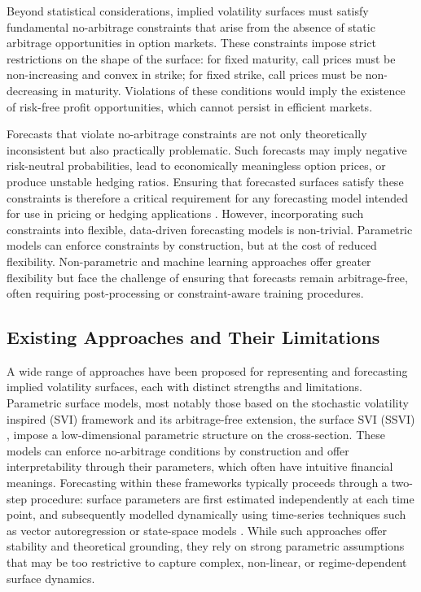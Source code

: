 Beyond statistical considerations, implied volatility surfaces must satisfy fundamental no-arbitrage constraints that arise from the absence of static arbitrage opportunities in option markets. These constraints impose strict restrictions on the shape of the surface: for fixed maturity, call prices must be non-increasing and convex in strike; for fixed strike, call prices must be non-decreasing in maturity. Violations of these conditions would imply the existence of risk-free profit opportunities, which cannot persist in efficient markets.

Forecasts that violate no-arbitrage constraints are not only theoretically inconsistent but also practically problematic. Such forecasts may imply negative risk-neutral probabilities, lead to economically meaningless option prices, or produce unstable hedging ratios. Ensuring that forecasted surfaces satisfy these constraints is therefore a critical requirement for any forecasting model intended for use in pricing or hedging applications \cite{Gat:06,Fen:05}. However, incorporating such constraints into flexible, data-driven forecasting models is non-trivial. Parametric models can enforce constraints by construction, but at the cost of reduced flexibility. Non-parametric and machine learning approaches offer greater flexibility but face the challenge of ensuring that forecasts remain arbitrage-free, often requiring post-processing or constraint-aware training procedures.

\subsection{Existing Approaches and Their Limitations}

A wide range of approaches have been proposed for representing and forecasting implied volatility surfaces, each with distinct strengths and limitations. Parametric surface models, most notably those based on the stochastic volatility inspired (SVI) framework \cite{Gat:04} and its arbitrage-free extension, the surface SVI (SSVI) \cite{GatJac:14}, impose a low-dimensional parametric structure on the cross-section. These models can enforce no-arbitrage conditions by construction and offer interpretability through their parameters, which often have intuitive financial meanings. Forecasting within these frameworks typically proceeds through a two-step procedure: surface parameters are first estimated independently at each time point, and subsequently modelled dynamically using time-series techniques such as vector autoregression or state-space models \cite{Fen:05}. While such approaches offer stability and theoretical grounding, they rely on strong parametric assumptions that may be too restrictive to capture complex, non-linear, or regime-dependent surface dynamics.

